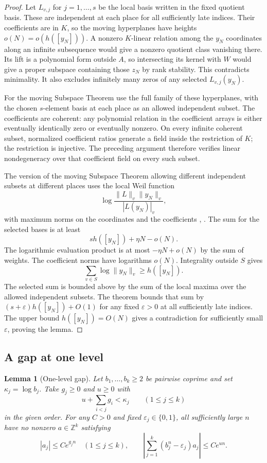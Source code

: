 \documentclass[11pt,a4paper,reqno]{amsart}
\newtheorem{lemma}[theorem]{Lemma}
\theoremstyle{definition}
\theoremstyle{remark}
\numberwithin{equation}{section}
\begin{document}
\begin{proof}
Let \(L_{v,j}\) for \(j=1,\ldots,s\) be the local basis
written in the fixed quotient basis. These are independent
at each place for all sufficiently late indices. Their
coefficients are in \(K\), so the moving hyperplanes have
heights \(o(N)=o(h([y_N]))\). A nonzero \(K\)-linear
relation among the \(y_N\) coordinates along an infinite
subsequence would give a nonzero quotient class vanishing
there. Its lift is a polynomial form outside \(A\), so
intersecting its kernel with \(W\) would give a proper
subspace containing those \(z_N\) by rank stability. This
contradicts minimality. It also excludes infinitely many
zeros of any selected \(L_{v,j}(y_N)\).

For the moving Subspace Theorem use the full family of these
hyperplanes, with the chosen \(s\)-element basis at each place
as an allowed independent subset. The coefficients are
coherent: any polynomial relation in the coefficient arrays
is either eventually identically zero or eventually nonzero.
On every infinite coherent subset, normalized coefficient
ratios generate a field inside the restriction of \(K\);
the restriction is injective. The preceding argument therefore
verifies linear nondegeneracy over that coefficient field on
every such subset.

The version of the moving Subspace Theorem allowing
different independent subsets at different places uses
the local Weil function
\[
                \log\frac{\|L\|_v\|y_N\|_v}{|L(y_N)|_v},
\]
with maximum norms on the coordinates and the coefficients
\cite[Theorem~7.7]{Vojta}, \cite{RuVojta}. The sum for
the selected bases is at least
\[
  s h([y_N])+\eta N-o(N).
\]
The logarithmic evaluation product is at most
\(-\eta N+o(N)\) by the sum of weights. The coefficient norms
have logarithms \(o(N)\). Integrality outside \(S\) gives
\[
              \sum_{v\in S}\log\|y_N\|_v\ge h([y_N]).
\]
The selected sum is bounded above by the sum of the
local maxima over the allowed independent subsets. The
theorem bounds that sum by \((s+\varepsilon)h([y_N])+O(1)\)
for any fixed \(\varepsilon>0\) at all sufficiently late
indices. The upper bound \(h([y_N])=O(N)\) gives a contradiction
for sufficiently small \(\varepsilon\), proving the lemma.
\end{proof}

\subsection{A gap at one level}

\begin{lemma}[One-level gap]\label{lem:onelevel}
Let \(b_1,\ldots,b_k\ge2\) be pairwise coprime and set
\(\kappa_j=\log b_j\). Take \(g_j\ge0\) and \(u\ge0\) with
\[
          u+\sum_{i<j}g_i<\kappa_j\qquad(1\le j\le k)
\]
in the given order. For any \(C>0\) and fixed
\(\varepsilon_j\in\{0,1\}\), all sufficiently large \(n\)
have no nonzero \(a\in\mathbb Z^k\) satisfying
\[
  |a_j|\le C e^{g_jn}\quad(1\le j\le k),
  \qquad
  \left|\sum_{j=1}^k(b_j^n-\varepsilon_j)a_j\right|
                                            \le C e^{un}.
\]
\end{lemma}
\end{document}
